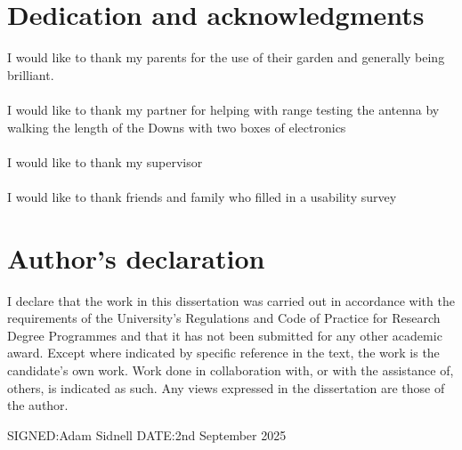 \documentclass[11pt]{article}
\begin{document}


\newpage
\section*{Dedication and acknowledgments}
I would like to thank my parents for the use of their garden and generally being
brilliant.

\paragraph{}I would like to thank my partner for helping with range testing the
antenna by walking the length of the Downs with two boxes of electronics

\paragraph{}I would like to thank my supervisor

\paragraph{}I would like to thank friends and family who filled in a usability
survey



\newpage
\section*{Author's declaration}
I declare that the work in this dissertation was carried out in accordance with
the requirements of the University's Regulations and Code of Practice for
Research Degree Programmes and that it has not been submitted for any other
academic award. Except where indicated by specific reference in the text, the
work is the candidate's own work. Work done in collaboration with, or with the
assistance of, others, is indicated as such. Any views expressed in the
dissertation are those of the author.


SIGNED:\qquad Adam Sidnell \qquad \qquad \qquad DATE:\qquad    2nd September
2025


\clearpage
\begingroup
\pagestyle{plain}
\vspace*{3cm}
\tableofcontents
\clearpage
\endgroup

\clearpage
\begingroup
\pagestyle{plain}
\vspace*{3cm}
\listoffigures
\clearpage
\endgroup
\end{document}
